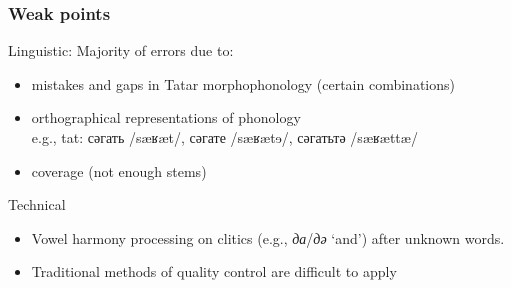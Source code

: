 \documentclass[10pt,xetex]{beamer} %
\begin{document}
\begin{frame}
  \frametitle{Weak points}

\begin{block}{Linguistic: Majority of errors due to:}
  
  \begin{itemize} %
    \item mistakes and gaps in Tatar morphophonology (certain combinations)\\
    \item orthographical representations of phonology\\
		e.g., tat: сәгать /{\qipa sæʁæt}/, сәгате /{\qipa sæʁætɘ}/, сәгатьтә /{\qipa sæʁættæ}/
    \item coverage (not enough stems)
  \end{itemize}
  
\end{block}

\begin{block}{Technical}
  \begin{itemize}
    \item Vowel harmony processing on clitics (e.g., \emph{да}/\emph{дә} `and')  
       after unknown words.
    \item Traditional methods of quality control are difficult to apply
  \end{itemize} 
\end{block}

\end{frame}
\end{document}

